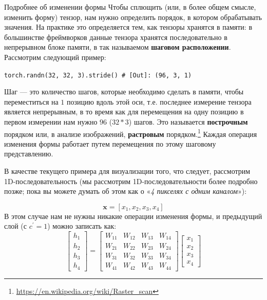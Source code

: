 \begin{supportbox}{Подробнее об изменении формы}
%
Чтобы сплющить (или, в более общем смысле, изменить форму) тензор, нам нужно определить порядок, в котором обрабатывать значения. На практике это определяется тем, как тензоры хранятся в памяти: в большинстве фреймворков данные тензора хранятся последовательно в непрерывном блоке памяти, в так называемом \textbf{шаговом расположении}. Рассмотрим следующий пример:

\vspace{1em}
\begin{center}
\footnotesize
\texttt{torch.randn(32, 32, 3).stride() # [Out]: (96, 3, 1)}
\end{center}
\vspace{1em}

Шаг — это количество шагов, которые необходимо сделать в памяти, чтобы переместиться на $1$ позицию вдоль этой оси, т.е. последнее измерение тензора является непрерывным, в то время как для перемещения на одну позицию в первом измерении нам нужно $96$ ($32*3$) шагов. Это называется \textbf{построчным} порядком или, в анализе изображений, \textbf{растровым} порядком.\footnote{\url{https://en.wikipedia.org/wiki/Raster_scan}} Каждая операция изменения формы работает путем перемещения по этому шаговому представлению.
%
\end{supportbox}

В качестве текущего примера для визуализации того, что следует, рассмотрим 1D-последовательность (мы рассмотрим 1D-последовательности более подробно позже; пока вы можете думать об этом как о «\textit{4 пикселях с одним каналом}»):

$$
\mathbf{x} = \left[x_1, x_2, x_3, x_4\right]
$$
%
В этом случае нам не нужны никакие операции изменения формы, и предыдущий слой (с $c^\prime = 1$) можно записать как:
%
$$
\begin{bmatrix} h_1 \\ h_2 \\ h_3 \\ h_4 \end{bmatrix}=\begin{bmatrix}W_{11} & W_{12} & W_{13} & W_{14} \\ W_{21} & W_{22} & W_{23} & W_{24} \\ W_{31} & W_{32} & W_{33} & W_{34} \\ W_{41} & W_{42} & W_{43} & W_{44} \end{bmatrix} \begin{bmatrix} x_1 \\ x_2 \\ x_3 \\ x_4 \end{bmatrix}
$$

